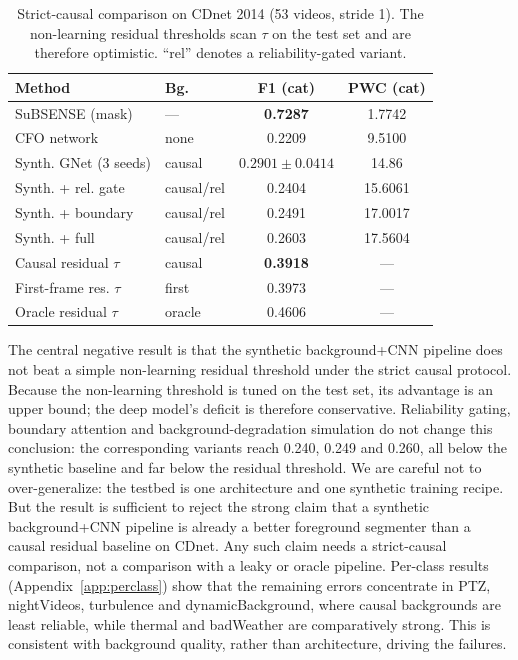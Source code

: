 \documentclass[sn-mathphys-num,iicol]{sn-jnl}
\begin{document}
\begin{table}[t]
\centering
\footnotesize
\setlength{\tabcolsep}{1.4pt}
\caption{Strict-causal comparison on CDnet 2014 (53 videos, stride 1). The
non-learning residual thresholds scan $\tau$ on the test set and are therefore
optimistic. ``rel'' denotes a reliability-gated variant.}
\label{tab:main}
\begin{tabular}{llcc}
\toprule
Method & Bg. & F1 (cat) & PWC (cat) \\
\midrule
SuBSENSE (mask) & --- & \textbf{0.7287} & 1.7742 \\
CFO network & none & 0.2209 & 9.5100 \\
Synth. GNet (3 seeds) & causal & $0.2901\pm0.0414$ & 14.86 \\
Synth. + rel. gate & causal/rel & 0.2404 & 15.6061 \\
Synth. + boundary & causal/rel & 0.2491 & 17.0017 \\
Synth. + full & causal/rel & 0.2603 & 17.5604 \\
Causal residual $\tau$ & causal & \textbf{0.3918} & --- \\
First-frame res. $\tau$ & first & 0.3973 & --- \\
Oracle residual $\tau$ & oracle & 0.4606 & --- \\
\bottomrule
\end{tabular}
\end{table}

The central negative result is that the synthetic background+CNN pipeline does
not beat a simple non-learning residual threshold under the strict causal
protocol. Because the non-learning threshold is tuned on the test set, its
advantage is an upper bound; the deep model's deficit is therefore conservative.
Reliability gating, boundary attention and background-degradation simulation do
not change this conclusion: the corresponding variants reach 0.240, 0.249 and
0.260, all below the synthetic baseline and far below the residual threshold.
We are careful not to over-generalize: the testbed is one architecture and one
synthetic training recipe. But the result is sufficient to reject the strong
claim that a synthetic background+CNN pipeline is already a better foreground
segmenter than a causal residual baseline on CDnet. Any such claim needs a
strict-causal comparison, not a comparison with a leaky or oracle pipeline.
Per-class results (Appendix~\ref{app:perclass}) show that the remaining errors
concentrate in PTZ, nightVideos, turbulence and dynamicBackground, where causal
backgrounds are least reliable, while thermal and badWeather are comparatively
strong. This is consistent with background quality, rather than architecture,
driving the failures.
\end{document}
